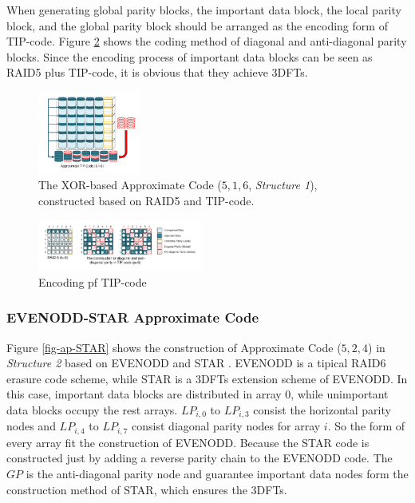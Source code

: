 \documentclass[sigconf]{acmart}
\begin{document}
When generating global parity blocks, the important data block, the local parity block, and the global parity block should be arranged as the encoding form of TIP-code. Figure \ref{fig-TIP} shows the coding method of diagonal and anti-diagonal parity blocks.
Since the encoding process of important data blocks can be seen as RAID5 plus TIP-code, it is obvious that they achieve 3DFTs.

\begin{figure}[]
\centering
\includegraphics[width=0.3\textwidth]{photo/AP-516.pdf}
\caption{The XOR-based Approximate Code ($5,1,6$, \emph{Structure 1}), constructed based on RAID5 and TIP-code.}
\label{fig-ap-TIP}
\end{figure}

\begin{figure}[]

    \includegraphics[width=0.48\textwidth]{photo/RAID5-TIP.pdf}

\caption{Encoding pf TIP-code}
\label{fig-TIP}
\end{figure}

\subsubsection{EVENODD-STAR Approximate Code}
Figure \ref{fig-ap-STAR} shows the construction of Approximate Code ($5,2,4$) in \emph{Structure 2} based on EVENODD \cite{blaum1995evenodd} and STAR \cite{huang2008star}. 
EVENODD is a tipical RAID6 erasure code scheme, while STAR is a 3DFTs extension scheme of EVENODD. In this case, important data blocks are distributed in array 0, while unimportant data blocks occupy the rest arrays. 
$LP_{i,0}$ to $LP_{i,3}$ consist the horizontal parity nodes and $LP_{i,4}$ to $LP_{i,7}$ consist diagonal parity nodes for array $i$. So the form of every array fit the construction of EVENODD. Because the STAR code is constructed just by adding a reverse parity chain to the EVENODD code. 
The $GP$ is the anti-diagonal parity node and guarantee important data nodes form the construction method of STAR, which ensures the 3DFTs.
\end{document}
